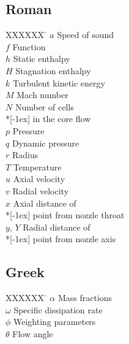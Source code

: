 \documentclass[12pt,a4paper]{article}
\begin{document}
\subsection*{Roman}
\begin{multicols}{2}
 \begin{tabbing}
  XXXXXX \= \kill %
  $a$       \> Speed of sound           \\
  $f$       \> Function                 \\
  $h$       \> Static enthalpy          \\
  $H$       \> Stagnation enthalpy      \\
  $k$       \> Turbulent kinetic energy \\
  $M$       \> Mach number              \\
  $N$       \> Number of cells          \\*[-1ex]
            \> in the core flow         \\
  $p$       \> Pressure                 \\
  $q$       \> Dynamic pressure         \\
  $r$       \> Radius                   \\
  $T$       \> Temperature              \\
  $u$       \> Axial velocity           \\
  $v$       \> Radial velocity          \\
  $x$       \> Axial distance of        \\*[-1ex]
            \> point from nozzle throat \\
  $y$, $Y$  \> Radial distance of       \\*[-1ex]
            \> point from nozzle axis   \\
 \end{tabbing}
\end{multicols}

\subsection*{Greek}
\begin{multicols}{2}
 \begin{tabbing}
  XXXXXX \= \kill %
  $\alpha$   \> Mass fractions            \\
  $\omega$   \> Specific dissipation rate \\
  $\phi$     \> Weighting parameters      \\
  $\theta$   \> Flow angle                \\
 \end{tabbing}
\end{multicols}
\end{document}
